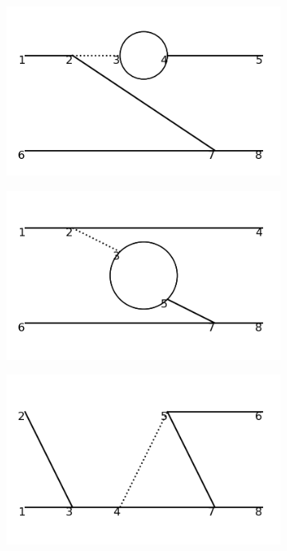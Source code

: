 \documentclass[11pt,a4paper,twoside,pdf]{article}
\numberwithin{equation}{section}
\begin{document}
\begin{figure}[h!]
\begin{subfigure}[t]{0.16\textwidth}
    \end{subfigure}
    \hfill
    \begin{subfigure}[t]{0.16\textwidth}
        \centering
        \includegraphics[width=\textwidth]{plots/order4_2to2/19.png}
    \end{subfigure}
    \hfill
    \begin{subfigure}[t]{0.16\textwidth}
        \centering
        \includegraphics[width=\textwidth]{plots/order4_2to2/20.png}
    \end{subfigure}
    \hfill
    \begin{subfigure}[t]{0.16\textwidth}
        \centering
        \includegraphics[width=\textwidth]{plots/order4_2to2/21.png}

\end{subfigure}
\end{figure}
\end{document}
